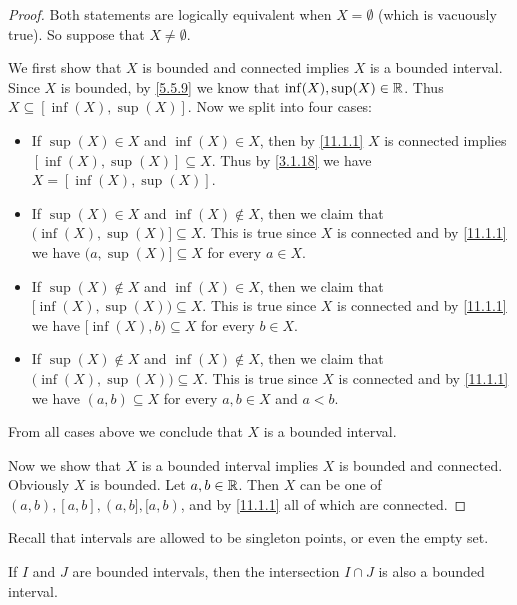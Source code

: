 \begin{proof}
  Both statements are logically equivalent when \(X = \emptyset\) (which is vacuously true).
  So suppose that \(X \neq \emptyset\).

  We first show that \(X\) is bounded and connected implies \(X\) is a bounded interval.
  Since \(X\) is bounded, by \cref{5.5.9} we know that \(\inf(X), \sup(X) \in \mathbb{R}\).
  Thus \(X \subseteq [\inf(X), \sup(X)]\).
  Now we split into four cases:
  \begin{itemize}
    \item If \(\sup(X) \in X\) and \(\inf(X) \in X\), then by \cref{11.1.1} \(X\) is connected implies \([\inf(X), \sup(X)] \subseteq X\).
          Thus by \cref{3.1.18} we have \(X = [\inf(X), \sup(X)]\).
    \item If \(\sup(X) \in X\) and \(\inf(X) \notin X\), then we claim that \(\big(\inf(X), \sup(X)] \subseteq X\).
          This is true since \(X\) is connected and by \cref{11.1.1} we have \(\big(a, \sup(X)] \subseteq X\) for every \(a \in X\).
    \item If \(\sup(X) \notin X\) and \(\inf(X) \in X\), then we claim that \([\inf(X), \sup(X)\big) \subseteq X\).
          This is true since \(X\) is connected and by \cref{11.1.1} we have \([\inf(X), b\big) \subseteq X\) for every \(b \in X\).
    \item If \(\sup(X) \notin X\) and \(\inf(X) \notin X\), then we claim that \(\big(\inf(X), \sup(X)\big) \subseteq X\).
          This is true since \(X\) is connected and by \cref{11.1.1} we have \((a, b) \subseteq X\) for every \(a, b \in X\) and \(a < b\).
  \end{itemize}
  From all cases above we conclude that \(X\) is a bounded interval.

  Now we show that \(X\) is a bounded interval implies \(X\) is bounded and connected.
  Obviously \(X\) is bounded.
  Let \(a, b \in \mathbb{R}\).
  Then \(X\) can be one of \((a, b), [a, b], (a, b], [a, b)\), and by \cref{11.1.1} all of which are connected.
\end{proof}

\begin{rmk}\label{11.1.5}
  Recall that intervals are allowed to be singleton points, or even the empty set.
\end{rmk}

\begin{cor}\label{11.1.6}
  If \(I\) and \(J\) are bounded intervals, then the intersection \(I \cap J\) is also a bounded interval.
\end{cor}

